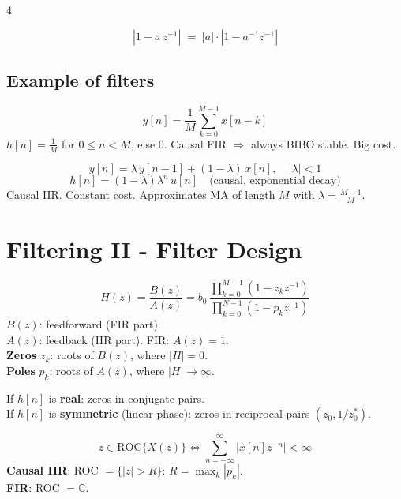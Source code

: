 \documentclass[8pt,a4paper,landscape]{extarticle}
\begin{document}
\begin{multicols*}{4}
\begin{warn}[title=Unit-circle modulus reflection identity]
\[
\left|1 - a\,z^{-1}\right| \;=\; |a| \cdot \left|1 - a^{-1} z^{-1}\right|
\]
\end{warn}
\subsection{Example of filters}

\begin{defn}[title=Moving Average (MA)]
\[y[n]=\frac{1}{M}\sum_{k=0}^{M-1}x[n-k]\]
$h[n]=\tfrac{1}{M}$ for $0\le n<M$, else $0$.
Causal FIR $\Rightarrow$ always BIBO stable. Big cost.
\end{defn}

\begin{defn}[title=Leaky Integrator (LI)]
\[y[n]=\lambda\,y[n-1]+(1-\lambda)\,x[n], \quad |\lambda|<1\]
\[h[n]=(1-\lambda)\lambda^n\,u[n]\quad\text{(causal, exponential decay)}\]
Causal IIR. Constant cost. Approximates MA of length $M$ with $\lambda=\frac{M-1}{M}$.
\end{defn}

\section{Filtering II - Filter Design}

\begin{defn}[title=Transfer function $H(z)$]
\[H(z)  = \frac{B(z)}{A(z)} = b_0\,\frac{\displaystyle\prod_{k=0}^{M-1}(1-z_k z^{-1})}{\displaystyle\prod_{k=0}^{N-1}(1-p_k z^{-1})}\]
$B(z)$: feedforward (FIR part).\\$A(z)$: feedback (IIR part). FIR: $A(z)=1$.\\
\textbf{Zeros} $z_k$: roots of $B(z)$, where $|H|=0$.\\
\textbf{Poles} $p_k$: roots of $A(z)$, where $|H|\to\infty$.
\end{defn}

\begin{prop}[title=Zero symmetry]
If $h[n]$ is \textbf{real}: zeros in conjugate pairs.\\
If $h[n]$ is \textbf{symmetric} (linear phase): zeros in reciprocal pairs $(z_0, 1/z_0^*)$.
\end{prop}

\begin{prop}[title=ROC \& causality]
\[z \in \text{ROC}\{X(z)\} \iff \sum_{n=-\infty}^{\infty} \left|x[n]z^{-n}\right| < \infty\]
\textbf{Causal IIR}: ROC $= \{|z|>R\}$: $R=\max_k|p_k|$.\\
\textbf{FIR}: ROC $= \mathbb{C}$.
\end{prop}


\end{multicols*}
\end{document}
